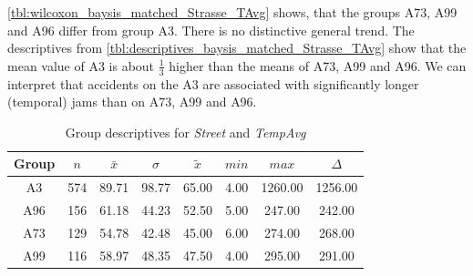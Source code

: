 \autoref{tbl:wilcoxon_baysis_matched_Strasse_TAvg} shows, that the groups A73, A99 and A96 differ from group A3. There is no distinctive general trend. The descriptives from \autoref{tbl:descriptives_baysis_matched_Strasse_TAvg} show that the mean value of A3 is about $\frac{1}{3}$ higher than the means of A73, A99 and A96. We can interpret that accidents on the A3 are associated with significantly longer (temporal) jams than on A73, A99 and A96.
\begin{table}[ht]
	\tiny
	\centering
	\begin{tabular}{c|c|c|c|c|c|c|c}
		\toprule
		Group & $n$ & $\bar{x}$ & $\sigma$ & $\tilde{x}$ & $min$ & $max$ & $\Delta$ \\  
		\midrule
		A3 & 574 & 89.71 & 98.77 & 65.00 & 4.00 & 1260.00 & 1256.00 \\ 
		A96 & 156 & 61.18 & 44.23 & 52.50 & 5.00 & 247.00 & 242.00 \\ 
		A73 & 129 & 54.78 & 42.48 & 45.00 & 6.00 & 274.00 & 268.00 \\ 
		A99 & 116 & 58.97 & 48.35 & 47.50 & 4.00 & 295.00 & 291.00 \\ 
		\bottomrule
	\end{tabular}
	\caption{Group descriptives for \textit{Street} and \textit{TempAvg}}
	\label{tbl:descriptives_baysis_matched_Strasse_TAvg}
\end{table}

